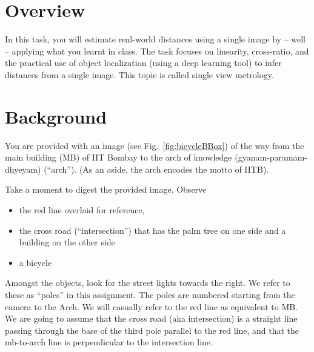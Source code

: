 
\section{Overview}

In this task, you will estimate real-world distances using a single
image by -- well -- applying what you learnt in class. The task
focuses on  linearity, cross-ratio, and the practical use
of object localization (using a  deep learning tool) to infer
distances from a single image. This topic is called single view metrology.

\section{Background}

You are provided with an image (see Fig.~\ref{fig:bicycleBBox}) of
the way from the main building
(MB) of IIT Bombay to the arch of knowledge (gyanam-paramam-dhyeyam) (``arch''). (As an aside, the arch encodes the motto of IITB).

Take a moment to digest the provided image. Observe
\begin{itemize} 
\item the red line overlaid for reference, 
\item the cross road (``intersection'') that has the palm tree on one side and a building
on the other side
\item a bicycle
\end{itemize}

Amongst the  objects, look for the street lights  towards the right. We refer to these as 
``poles'' in this assignment. The poles are numbered starting from the camera to the Arch. We will casually refer to the red line as equivalent to MB.
We are
going to assume that the cross road (aka intersection)  is a straight line passing
through the base of the third pole parallel to the red
line, and that the mb-to-arch line is perpendicular to
the intersection line.




